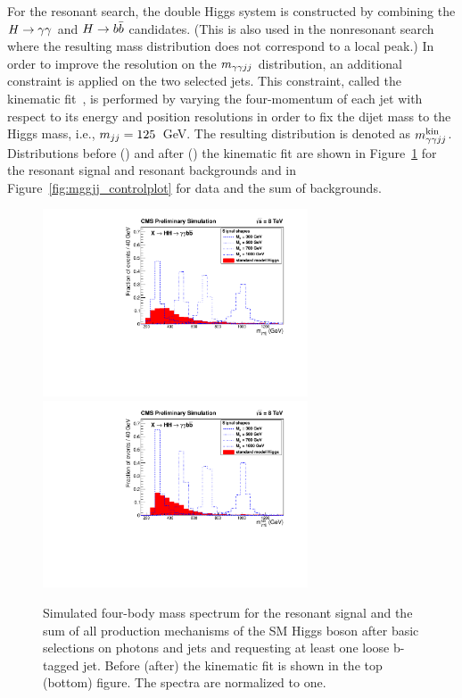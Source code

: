 For the resonant search, the double Higgs system is constructed
by combining the $H\to\gamma\gamma$ and $H\to b\bar{b}$ candidates. (This is also used in the nonresonant search
where the resulting mass distribution does not correspond to a local peak.)
In order to improve the resolution on the $m_{\gamma\gamma jj}$ distribution, an additional constraint
is applied on the two selected jets.
This constraint, called the kinematic fit~\cite{Chatrchyan:2013yoa},
is performed by varying the four-momentum of each jet with respect to its energy and position
resolutions in order to fix the dijet mass to the Higgs mass, i.e., $m_{jj} = 125$~GeV.
The resulting distribution is denoted as $m_{\gamma\gamma jj}^{\rm kin}$. Distributions before (\Mggjj) and after (\Mggjjk)
the kinematic fit
are shown in Figure~\ref{fig:mggjj_onlyhiggs} for the resonant signal and resonant backgrounds
and in Figure~\ref{fig:mggjj_controlplot} for data and the sum of backgrounds.

\begin{figure}[htbp!]
 \begin{center}
   \includegraphics[width=0.70\textwidth]{figures/selection/TotalMass_OnlyHiggs.pdf}
   \includegraphics[width=0.70\textwidth]{figures/selection/TotalMassKinFit_OnlyHiggs.pdf}
 \end{center}
\caption{Simulated four-body mass spectrum for the resonant signal and the sum of all production
mechanisms of the
SM Higgs boson after basic selections on photons and jets and requesting at least
one loose b-tagged jet. Before (after) the kinematic fit is shown in the top (bottom) figure.
The spectra are normalized to one.}
\label{fig:mggjj_onlyhiggs}
\end{figure}

